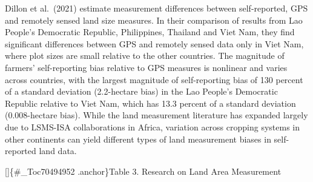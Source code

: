 \documentclass[
]{book}
\begin{document}
Dillon et al.~(2021) estimate measurement differences between self-reported, GPS and remotely sensed land size measures. In their comparison of results from Lao People's Democratic Republic, Philippines, Thailand and Viet Nam, they find significant differences between GPS and remotely sensed data only in Viet Nam, where plot sizes are small relative to the other countries. The magnitude of farmers' self-reporting bias relative to GPS measures is nonlinear and varies across countries, with the largest magnitude of self-reporting bias of 130 percent of a standard deviation (2.2-hectare bias) in the Lao People's Democratic Republic relative to Viet Nam, which has 13.3 percent of a standard deviation (0.008-hectare bias). While the land measurement literature has expanded largely due to LSMS-ISA collaborations in Africa, variation across cropping systems in other continents can yield different types of land measurement biases in self-reported land data.

{[}{]}\{\#\_Toc70494952 .anchor\}Table 3. Research on Land Area Measurement
\end{document}
